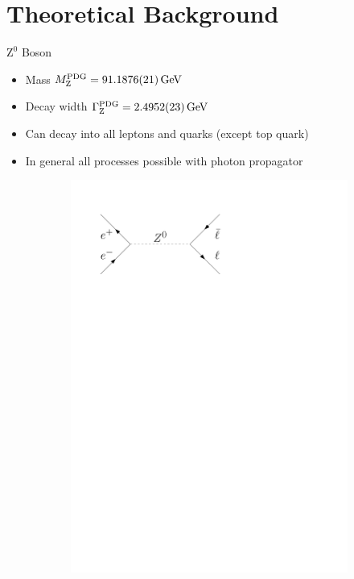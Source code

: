 \documentclass[11pt,xcolor=dvipsnames,professionalfonts]{beamer}
\begin{document}
\section{Theoretical Background}
\begin{frame}{$\mathrm{Z}^0$ Boson}
	\begin{itemize}
		\item Mass $M_\mathrm{Z}^\mathrm{PDG} = \SI{91.1876 +- 0.0021}{GeV}$
		\item Decay width $\Gamma_\mathrm{Z}^\mathrm{PDG} = \SI{2.4952 +- 0.0023}{GeV}$
		\item Can decay into all leptons and quarks (except top quark)
		\item In general all processes possible with photon propagator
	\end{itemize}
	\begin{figure}[htb]
		\centering
		\begin{subfigure}{.28\textwidth}
			\centering
			\includegraphics[width=.8\textwidth]{./figures/theory/feynman/ll}
		\end{subfigure}
		\begin{subfigure}{.28\textwidth}
			\centering

\end{subfigure}
\end{figure}
\end{frame}
\end{document}
